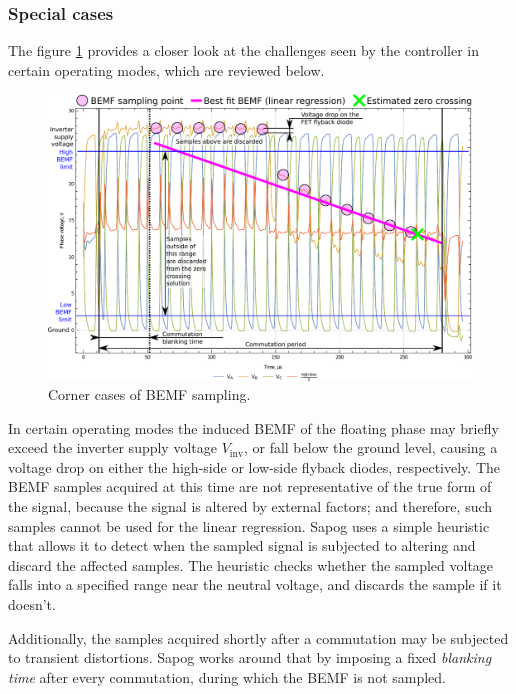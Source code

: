\documentclass{zubaxdoc}
\begin{document}
\subsubsection{Special cases}

The figure \ref{phase_voltage_sampling_corner_cases} provides a closer look at the challenges
seen by the controller in certain operating modes, which are reviewed below.

\begin{figure}[hbtp]
    \centering
	\includegraphics[width=\textwidth]{phase_voltages_braking_high_advance_angle}
	\caption{Corner cases of BEMF sampling.
	\label{phase_voltage_sampling_corner_cases}}
\end{figure}

In certain operating modes the induced BEMF of the floating phase may briefly exceed the
inverter supply voltage $V_\text{inv}$, or fall below the ground level,
causing a voltage drop on either the high-side or low-side flyback diodes, respectively.
The BEMF samples acquired at this time are not representative of the true form of the signal,
because the signal is altered by external factors;
and therefore, such samples cannot be used for the linear regression.
Sapog uses a simple heuristic that allows it to detect when the sampled signal is subjected to
altering and discard the affected samples.
The heuristic checks whether the sampled voltage falls into a specified range near the neutral voltage,
and discards the sample if it doesn't.

Additionally, the samples acquired shortly after a commutation may be subjected to transient distortions.
Sapog works around that by imposing a fixed \emph{blanking time} after every commutation, during which
the BEMF is not sampled.
\end{document}
